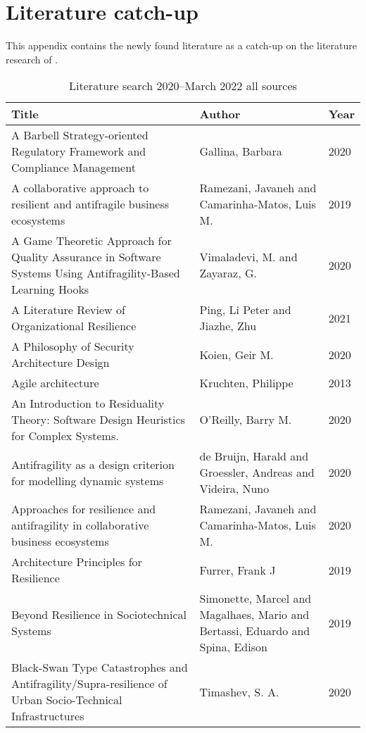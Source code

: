 \chapter{Literature catch-up}
\label{app:literaturecatchup}
This appendix contains the newly found literature as a catch-up on the literature research of \textcite{Botjes2020}.

\begin{longtable}{p{}p{}p{}}
	\toprule%
	\textbf{Title} & \textbf{Author} & \textbf{Year} \\
	\midrule%
	\endhead%
	\hline
	\endfoot%
	\caption[Literature search 2020--March 2022 all sources]{Literature search 2020--March 2022 all sources}
	\label{tab:literatureafter2020all}
	\endlastfoot%
		A Barbell Strategy-oriented Regulatory Framework and Compliance Management & Gallina, Barbara & 2020 \\
		A collaborative approach to resilient and antifragile business ecosystems & Ramezani, Javaneh and Camarinha-Matos, Luis M. & 2019 \\
		A Game Theoretic Approach for Quality Assurance in Software Systems Using Antifragility-Based Learning Hooks & Vimaladevi, M. and Zayaraz, G. & 2020 \\
		A Literature Review of Organizational Resilience & Ping, Li Peter and Jiazhe, Zhu & 2021 \\
		A Philosophy of Security Architecture Design & Koien, Geir M. & 2020 \\
		Agile architecture & Kruchten, Philippe & 2013 \\
		An Introduction to Residuality Theory: Software Design Heuristics for Complex Systems. & O'Reilly, Barry M. & 2020 \\
		Antifragility as a design criterion for modelling dynamic systems & de Bruijn, Harald and Groessler, Andreas and Videira, Nuno & 2020 \\
		Approaches for resilience and antifragility in collaborative business ecosystems & Ramezani, Javaneh and Camarinha-Matos, Luis M. & 2020 \\
		Architecture Principles for Resilience & Furrer, Frank J & 2019 \\
		Beyond Resilience in Sociotechnical Systems & Simonette, Marcel and Magalhaes, Mario and Bertassi, Eduardo and Spina, Edison & 2019 \\
		Black-Swan Type Catastrophes and Antifragility/Supra-resilience of Urban Socio-Technical Infrastructures & Timashev, S. A. & 2020 \\

\end{longtable}
